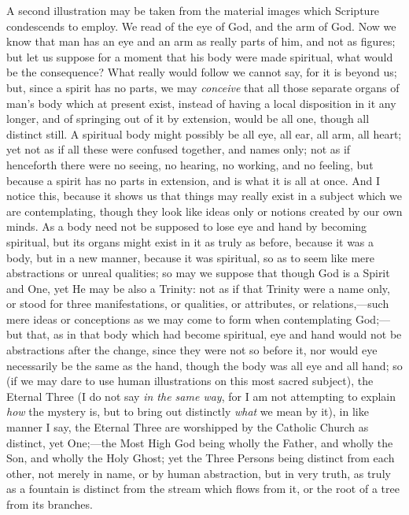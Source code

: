 A second illustration may be taken from the material images which
Scripture condescends to employ. We read of the eye of God, and the
arm of God. Now we know that man has an eye and an arm as really parts
of him, and not as figures; but let us suppose for a moment that his
body were made spiritual, what would be the consequence? What really
would follow we cannot say, for it is beyond us; but, since a spirit
has no parts, we may \emph{conceive} that all those separate organs of
man's body which at present exist, instead of having a local
disposition in it any longer, and of springing out of it by extension,
would be all one, though all distinct still. A spiritual body might
possibly be all eye, all ear, all arm, all heart; yet not as if all
these were confused together, and names only; not as if henceforth
there were no seeing, no hearing, no working, and no feeling, but
because a spirit has no parts in extension, and is what it is all at
once. And I notice this, because it shows us that things may really
exist in a subject which we are contemplating, though they look like
ideas only or notions created by our own minds. As a body need not be
supposed to lose eye and hand by becoming spiritual, but its organs
might exist in it as truly as before, because it was a body, but in a
new manner, because it was spiritual, so as to seem like mere
abstractions or unreal qualities; so may we suppose that though God is
a Spirit and One, yet He may be also a Trinity: not as if that Trinity
were a name only, or stood for three manifestations, or qualities, or
attributes, or relations,—such mere ideas or conceptions as we may
come to form when contemplating God;—but that, as in that body which
had become spiritual, eye and hand would not be abstractions after the
change, since they were not so before it, nor would eye necessarily be
the same as the hand, though the body was all eye and all hand; so (if
we may dare to use human illustrations on this most sacred subject),
the Eternal Three (I do not say \emph{in the same way}, for I am not
attempting to explain \emph{how} the mystery is, but to bring out
distinctly \emph{what} we mean by it), in like manner I say, the
Eternal Three are worshipped by the Catholic Church as distinct, yet
One;—the Most High God being wholly the Father, and wholly the Son,
and wholly the Holy Ghost; yet the Three Persons being distinct from
each other, not merely in name, or by human abstraction, but in very
truth, as truly as a fountain is distinct from the stream which flows
from it, or the root of a tree from its branches.

